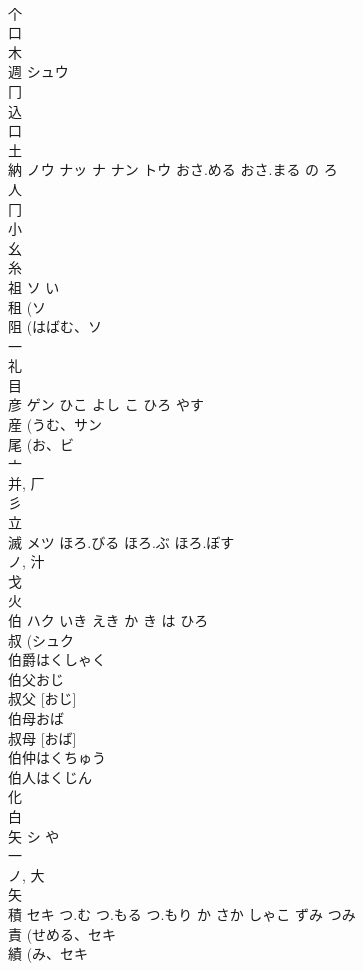 \documentclass[8pt]{extreport}
\begin{document}
\begin{CJK}{UTF8}{min}
\\	个 
\\	口 
\\	木 
\\	週	シュウ		
\\	冂 
\\	込 
\\	口 
\\	土 
\\	納	ノウ ナッ ナ ナン トウ	おさ.める おさ.まる の ろ	
\\	人 
\\	冂 
\\	小 
\\	幺 
\\	糸 
\\	祖	ソ	い	
\\	租 (ソ 
\\	阻 (はばむ、ソ 
\\	一 
\\	礼 
\\	目 
\\	彦	ゲン	ひこ よし こ ひろ やす	
\\	産 (うむ、サン 
\\	尾 (お、ビ 
\\	亠 
\\	并, 厂 
\\	彡 
\\	立 
\\	滅	メツ	ほろ.びる ほろ.ぶ ほろ.ぼす	
\\	ノ, 汁 
\\	戈 
\\	火 
\\	伯	ハク	いき えき か き は ひろ	
\\	叔 (シュク 
\\	伯爵はくしゃく
\\	伯父おじ
\\	叔父 [おじ] 
\\	伯母おば
\\	叔母 [おば] 
\\	伯仲はくちゅう
\\	伯人はくじん
\\	化 
\\	白 
\\	矢	シ	や	
\\	一 
\\	ノ, 大 
\\	矢 
\\	積	セキ	つ.む つ.もる つ.もり か さか しゃこ ずみ つみ	
\\	責 (せめる、セキ 
\\	績 (み、セキ 

\end{CJK}
\end{document}
